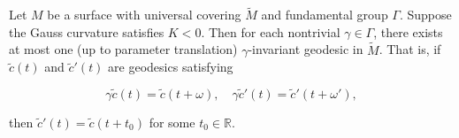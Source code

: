 Let $M$ be a surface with universal covering $\tilde{M}$ and fundamental group $\Gamma$. Suppose the Gauss curvature satisfies $K < 0$. Then for each nontrivial $\gamma \in \Gamma$, there exists at most one (up to parameter translation) $\gamma$-invariant geodesic in $\tilde{M}$. That is, if $\tilde{c}(t)$ and $\tilde{c}'(t)$ are geodesics satisfying

$$\gamma \tilde{c}(t) = \tilde{c}(t + \omega), \quad \gamma \tilde{c}'(t) = \tilde{c}'(t + \omega'),$$

then $\tilde{c}'(t) = \tilde{c}(t + t_0)$ for some $t_0 \in \mathbb{R}$.
